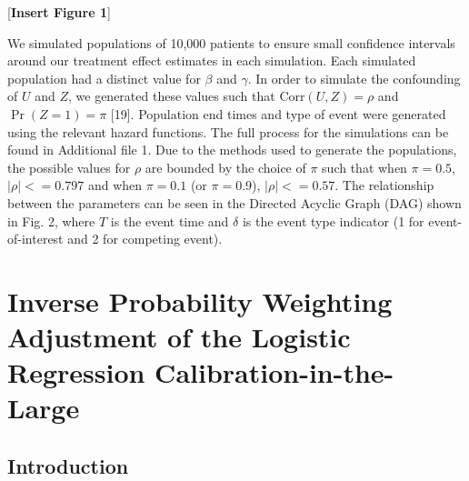 \documentclass[12pt,twoside]{reedthesis}
\begin{document}
{[}\textbf{Insert Figure 1}{]}

We simulated populations of 10,000 patients to ensure small confidence intervals around our treatment effect estimates in each simulation. Each simulated population had a distinct value for \(\beta\) and \(\gamma\). In order to simulate the confounding of \(U\) and \(Z\), we generated these values such that \(\textrm{Corr}(U,Z) = \rho\) and \(\Pr(Z = 1) = \pi\) {[}19{]}. Population end times and type of event were generated using the relevant hazard functions. The full process for the simulations can be found in Additional file 1. Due to the methods used to generate the populations, the possible values for \(\rho\) are bounded by the choice of \(\pi\) such that when \(\pi = 0.5\), \(\left|\rho\right| <= 0.797\) and when \(\pi = 0.1\) (or \(\pi=0.9\)), \(\left|\rho\right| <= 0.57\). The relationship between the parameters can be seen in the Directed Acyclic Graph (DAG) shown in Fig. 2, where \(T\) is the event time and \(\delta\) is the event type indicator (1 for event-of-interest and 2 for competing event).

\hypertarget{chap-IPCW-logistic}{%
\chapter{Inverse Probability Weighting Adjustment of the Logistic Regression Calibration-in-the-Large}\label{chap-IPCW-logistic}}

\hypertarget{introduction-2}{%
\section{Introduction}\label{introduction-2}}
\end{document}
